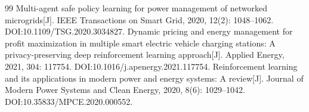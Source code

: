 \documentclass[UTF8,a4paper,11pt]{ctexart}
\begin{document}
\begin{thebibliography}{99}
 Multi-agent safe policy learning for power management of networked microgrids[J]. IEEE Transactions on Smart Grid, 2020, 12(2): 1048--1062. DOI:10.1109/TSG.2020.3034827.
 Dynamic pricing and energy management for profit maximization in multiple smart electric vehicle charging stations: A privacy-preserving deep reinforcement learning approach[J]. Applied Energy, 2021, 304: 117754. DOI:10.1016/j.apenergy.2021.117754.
 Reinforcement learning and its applications in modern power and energy systems: A review[J]. Journal of Modern Power Systems and Clean Energy, 2020, 8(6): 1029--1042. DOI:10.35833/MPCE.2020.000552.
\end{thebibliography}
\end{document}
